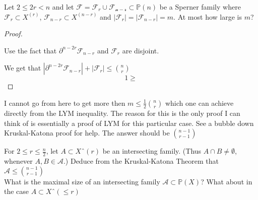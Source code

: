 \documentclass[a4paper]{article}
\newcommand{\shadow}{\partial}
\renewcommand{\P}{\mathbb P}
\begin{document}
  \begin{question}[Question 4]
    Let $2 \leq 2r < n$ and let $\mathcal{F} = \mathcal{F}_r \cup
    \mathcal{F_{n-r}} \subset \P(n)$ be a Sperner family where $\mathcal{F}_r
    \subset X^{(r)}$, $\mathcal{F}_{n-r} \subset X^{(n-r)}$ and
    $|\mathcal{F}_r| = |\mathcal{F}_{n-r}| = m$. At most how large is $m$?
  \end{question}
  \begin{proof}
    \begin{idea}
      Use the fact that $\shadow^{n-2r}{\mathcal{F}_{n-r}}$ and $\mathcal{F}_r$
      are disjoint.
    \end{idea}
    We get that $|\shadow^{n-2r}{\mathcal{F}_{n-r}}| + |\mathcal{F}_r| \leq {n
      \choose r}$
    \[1 \geq \]
  \end{proof}
  \begin{remark}
    I cannot go from here to get more then $m \leq \frac{1}{2} \binom{n}{r}$
    which one can achieve directly from the LYM inequality. The reason for this
    is the only proof I can think of is essentially a proof of LYM for this
    particular case. See a bubble down Kruskal-Katona proof for help. The answer
    should be $\binom{n-1}{r-1}$
  \end{remark}

  \begin{question}[Question 5]
    For $2 \leq r \leq \frac{n}{2}$, let $A \subset Xˆ{(r)}$ be an intersecting
    family. (Thus $A \cap B \neq \emptyset$, whenever $A, B \in \mathcal{A}$.)
    Deduce from the Kruskal-Katona Theorem that $\mathcal{A} \leq
    \binom{n-1}{r-1}$\\
    What is the maximal size of an intersecting family $\mathcal{A} \subset
    \P(X)$? What about in the case $A \subset Xˆ{(\leq r)}$
  \end{question}
  
\end{document}
